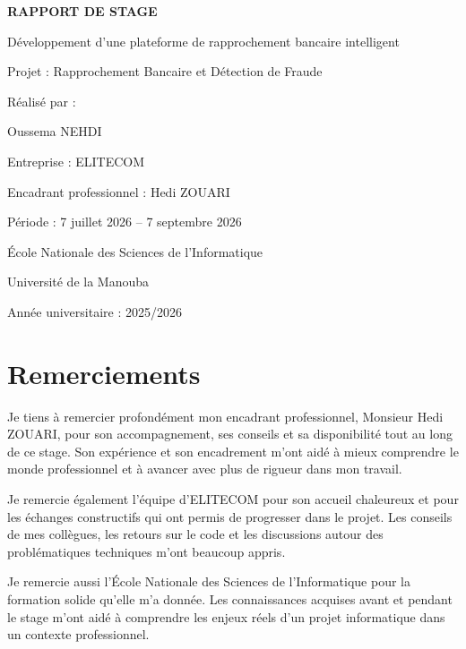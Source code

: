 ﻿\documentclass[12pt,a4paper]{report}
\begin{document}
\begin{titlepage}
    \centering
    \vspace*{2cm}
    {\Huge \textbf{RAPPORT DE STAGE}}\par
    \vspace{1cm}
    {\LARGE Développement d'une plateforme de rapprochement bancaire intelligent}\par
    \vspace{1.5cm}
    {\large Projet : Rapprochement Bancaire et Détection de Fraude}\par
    \vspace{2cm}
    {\large Réalisé par :}\par
    {\Large Oussema NEHDI}\par
    \vspace{1.5cm}
    {\large Entreprise : ELITECOM}\par
    {\large Encadrant professionnel : Hedi ZOUARI}\par
    \vspace{1.5cm}
    {\large Période : 7 juillet 2026 -- 7 septembre 2026}\par
    \vspace{2cm}
    {\large École Nationale des Sciences de l'Informatique}\par
    {\large Université de la Manouba}\par
    \vfill
    {\large Année universitaire : 2025/2026}
\end{titlepage}

\cleardoublepage
{}
\tableofcontents
\clearpage

\chapter*{Remerciements}
Je tiens à remercier profondément mon encadrant professionnel, Monsieur Hedi ZOUARI, pour son accompagnement, ses conseils et sa disponibilité tout au long de ce stage. Son expérience et son encadrement m'ont aidé à mieux comprendre le monde professionnel et à avancer avec plus de rigueur dans mon travail.

Je remercie également l'équipe d'ELITECOM pour son accueil chaleureux et pour les échanges constructifs qui ont permis de progresser dans le projet. Les conseils de mes collègues, les retours sur le code et les discussions autour des problématiques techniques m'ont beaucoup appris.

Je remercie aussi l'École Nationale des Sciences de l'Informatique pour la formation solide qu'elle m'a donnée. Les connaissances acquises avant et pendant le stage m'ont aidé à comprendre les enjeux réels d'un projet informatique dans un contexte professionnel.
\end{document}
